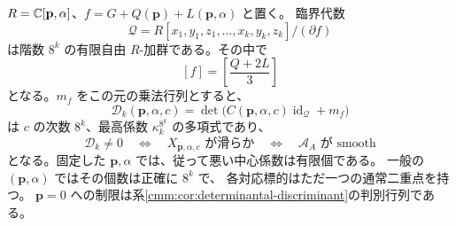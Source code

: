 \begin{corollary}[全線形族の有限判別行列]
\label{lcc:cor:linear-discriminant}
$R=\mathbb C[\mathbf p,\alpha]$、$f=G+Q(\mathbf p)+L(\mathbf p,\alpha)$ と置く。
臨界代数
\[
 \mathcal Q=R[x_1,y_1,z_1,\ldots,x_k,y_k,z_k]/(\partial f)
\]
は階数 $8^k$ の有限自由 $R$-加群である。その中で
\[
 [f]=\left[\frac{Q+2L}{3}\right]
\]
となる。$m_f$ をこの元の乗法行列とすると、
\begin{equation}\label{lcc:eq:linear-discriminant}
 \mathscr D_k(\mathbf p,\alpha,c)
   =\det\bigl(C(\mathbf p,\alpha,c)\operatorname{id}_{\mathcal Q}+m_f\bigr)
\end{equation}
は $c$ の次数 $8^k$、最高係数 $\kappa_k^{8^k}$ の多項式であり、
\[
 \mathscr D_k\ne0
 \quad\Longleftrightarrow\quad X_{\mathbf p,\alpha,c}\text{ が滑らか}
 \quad\Longleftrightarrow\quad\mathcal A_A\text{ が smooth}
\]
となる。固定した $\mathbf p,\alpha$ では、従って悪い中心係数は有限個である。
一般の $(\mathbf p,\alpha)$ ではその個数は正確に $8^k$ で、
各対応標的はただ一つの通常二重点を持つ。
$\mathbf p=0$ への制限は系\ref{cmm:cor:determinantal-discriminant}の判別行列である。
\end{corollary}

